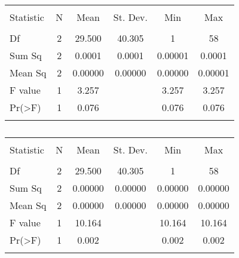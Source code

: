 \begin{table}[!htbp] \centering 
  \caption{} 
  \label{} 
\begin{tabular}{@{\extracolsep{5pt}}lccccc} 
\\[-1.8ex]\hline 
\hline \\[-1.8ex] 
Statistic & \multicolumn{1}{c}{N} & \multicolumn{1}{c}{Mean} & \multicolumn{1}{c}{St. Dev.} & \multicolumn{1}{c}{Min} & \multicolumn{1}{c}{Max} \\ 
\hline \\[-1.8ex] 
Df & 2 & 29.500 & 40.305 & 1 & 58 \\ 
Sum Sq & 2 & 0.0001 & 0.0001 & 0.00001 & 0.0001 \\ 
Mean Sq & 2 & 0.00000 & 0.00000 & 0.00000 & 0.00001 \\ 
F value & 1 & 3.257 &  & 3.257 & 3.257 \\ 
Pr(\textgreater F) & 1 & 0.076 &  & 0.076 & 0.076 \\ 
\hline \\[-1.8ex] 
\end{tabular} 
\end{table} 

\begin{table}[!htbp] \centering 
  \caption{} 
  \label{} 
\begin{tabular}{@{\extracolsep{5pt}}lccccc} 
\\[-1.8ex]\hline 
\hline \\[-1.8ex] 
Statistic & \multicolumn{1}{c}{N} & \multicolumn{1}{c}{Mean} & \multicolumn{1}{c}{St. Dev.} & \multicolumn{1}{c}{Min} & \multicolumn{1}{c}{Max} \\ 
\hline \\[-1.8ex] 
Df & 2 & 29.500 & 40.305 & 1 & 58 \\ 
Sum Sq & 2 & 0.00000 & 0.00000 & 0.00000 & 0.00000 \\ 
Mean Sq & 2 & 0.00000 & 0.00000 & 0.00000 & 0.00000 \\ 
F value & 1 & 10.164 &  & 10.164 & 10.164 \\ 
Pr(\textgreater F) & 1 & 0.002 &  & 0.002 & 0.002 \\ 
\hline \\[-1.8ex] 
\end{tabular} 
\end{table} 

